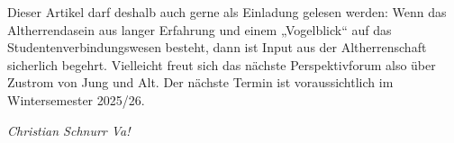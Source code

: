 \begin{multicols}{2}
Dieser Artikel darf deshalb auch gerne als
Einladung gelesen werden: Wenn das Altherrendasein aus langer Erfahrung und
einem „Vogelblick“ auf das Studentenverbindungswesen besteht, dann ist Input
aus der Altherrenschaft sicherlich begehrt. Vielleicht freut sich das nächste
Perspektivforum also über Zustrom von Jung und Alt. Der nächste Termin ist
voraussichtlich im Wintersemester 2025/26.

	\begin{flushright}
		\hfill\emph{Christian Schnurr Va!}
	\end{flushright}
\end{multicols}
%
